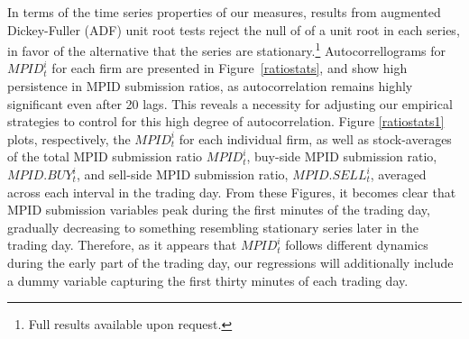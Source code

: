 \documentclass{article}
\begin{document}
In terms of the time series properties of our measures, results from augmented Dickey-Fuller (ADF) unit root tests reject the null of of a unit root in each series, in favor of the alternative that the series are stationary.\footnote{Full results available upon request.} Autocorrellograms for $MPID_t^i$ for each firm are presented in Figure~\ref{ratiostats}, and show high persistence in MPID submission ratios, as autocorrelation remains highly significant even after 20 lags. This reveals a necessity for adjusting our empirical strategies to control for this high degree of autocorrelation. Figure \ref{ratiostats1} plots, respectively, the $MPID_t^i$ for each individual firm, as well as stock-averages of the total MPID submission ratio $MPID_t^i$, buy-side MPID submission ratio, $MPID.BUY_t^i$, and sell-side MPID submission ratio, $MPID.SELL_t^i$, averaged across each interval in the trading day. From these Figures, it becomes clear that MPID submission variables peak during the first minutes of the trading day, gradually decreasing to something resembling stationary series later in the trading day. Therefore, as it appears that $MPID_t^i$ follows different dynamics during the early part of the trading day, our regressions will additionally include a dummy variable capturing the first thirty minutes of each trading day.
\end{document}
